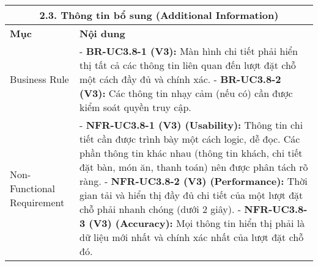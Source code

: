 \begin{longtable}{|m{4cm}|p{11cm}|}
\hline
\multicolumn{2}{|c|}{\textbf{2.3. Thông tin bổ sung (Additional Information)}} \\
\hline
\textbf{Mục} & \textbf{Nội dung} \\
\hline
Business Rule & - \textbf{BR-UC3.8-1 (V3):} Màn hình chi tiết phải hiển thị tất cả các thông tin liên quan đến lượt đặt chỗ một cách đầy đủ và chính xác. \newline - \textbf{BR-UC3.8-2 (V3):} Các thông tin nhạy cảm (nếu có) cần được kiểm soát quyền truy cập. \\
\hline
Non-Functional Requirement & - \textbf{NFR-UC3.8-1 (V3) (Usability):} Thông tin chi tiết cần được trình bày một cách logic, dễ đọc. Các phần thông tin khác nhau (thông tin khách, chi tiết đặt bàn, món ăn, thanh toán) nên được phân tách rõ ràng. \newline - \textbf{NFR-UC3.8-2 (V3) (Performance):} Thời gian tải và hiển thị đầy đủ chi tiết của một lượt đặt chỗ phải nhanh chóng (dưới 2 giây). \newline - \textbf{NFR-UC3.8-3 (V3) (Accuracy):} Mọi thông tin hiển thị phải là dữ liệu mới nhất và chính xác nhất của lượt đặt chỗ đó. \\
\hline
\end{longtable}

